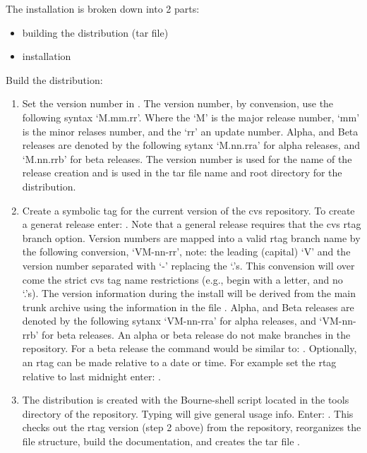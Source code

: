 The installation is broken down into 2 parts: 
  \begin{itemize}
  \item building the distribution (tar file)
  \item installation
  \end{itemize}

Build the \hypre{} distribution:

\begin{enumerate}

   \item Set the version number in .
   The version number, by convension, use the following syntax `M.mm.rr'.
   Where the `M' is the major release number, `mm' is the minor
   relases number, and the `rr' an update number. Alpha, and Beta 
   releases are denoted by the following sytanx `M.nn.rra' for 
   alpha releases, and `M.nn.rrb' for beta releases. The version 
   number is used for the name of the release creation and is used
   in the tar file name and root directory for the distribution.

   \item Create a symbolic tag for the current version
   of the cvs repository. To create a generat release enter:
   . Note that a
   general release requires that the cvs rtag branch option.
   Version numbers are mapped into a valid rtag branch name by the
   following conversion, `VM-nn-rr', note: the leading (capital)
   `V' and the version number separated with `-' replacing
   the `.'s. This convension will over come the strict cvs
   tag name restrictions (e.g., begin with a letter, and no `.'s).
   The version information during the install will be derived
   from the main trunk archive using the information in the
   file . Alpha, and Beta releases
   are denoted by the following sytanx `VM-nn-rra' for alpha
   releases, and `VM-nn-rrb' for beta releases. An alpha or
   beta release do not make branches in the repository. For a beta
   release the command would be similar to: 
   . Optionally, an rtag
   can be made relative to a date or time. For example set the
   rtag relative to last midnight enter:
   .

   \item The distribution is created with the  
   Bourne-shell script located in the tools directory of the 
   \hypre{} repository.  Typing  will give 
   general usage info. Enter: . This checks 
   out the rtag version (step 2 above) from the repository,
   reorganizes the file structure, build the documentation,
   and creates the tar file .

\end{enumerate}


